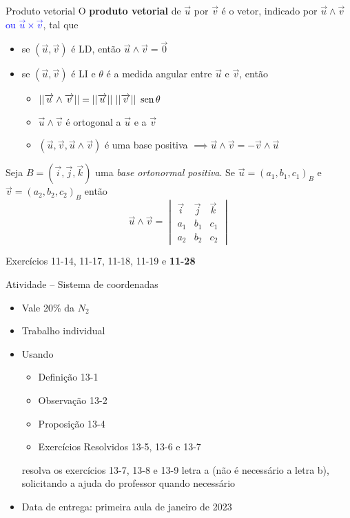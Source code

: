 \begin{frame}{Produto vetorial}
    O \textbf{produto vetorial} de \(\vec{u}\) por \(\vec{v}\) é o vetor, indicado por
    \(\vec{u}\wedge\vec{v}\) \textcolor{blue}{ou \(\vec{u}\times\vec{v}\)}, tal que
    \begin{itemize}
        \item se \((\vec{u},\vec{v})\) é LD, então \(\vec{u}\wedge\vec{v}=\vec{0}\)
        \item se \((\vec{u},\vec{v})\) é LI e \(\theta\) é a medida angular entre \(\vec{u}\) e \(\vec{v}\),
            então
            \begin{itemize}
                \item \(||\overrightarrow{u}\wedge\overrightarrow{v}||=||\overrightarrow{u}||~||\overrightarrow{v}||~\operatorname{sen}{\theta}\)
                \item \(\vec{u}\wedge\vec{v}\) é ortogonal a \(\vec{u}\) e a \(\vec{v}\)
                \item \((\vec{u},\vec{v}, \vec{u}\wedge\vec{v})\) é uma base positiva 
                    \(\implies \vec{u}\wedge\vec{v}=-\vec{v}\wedge\vec{u}\)
            \end{itemize}
    \end{itemize}

    \vspace{1cm}
    \pause
    Seja \(B=(\vec{i},\vec{j},\vec{k})\) uma \textit{base ortonormal positiva}. Se \(\vec{u}=(a_1,b_1,c_1)_B\) e
    \(\vec{v}=(a_2,b_2,c_2)_B\) então
    \[
        \vec{u}\wedge\vec{v}=
        \begin{vmatrix}
            \vec{i} & \vec{j} & \vec{k} \\
            a_1 & b_1 & c_1 \\
            a_2 & b_2 & c_2
        \end{vmatrix}
    \]

    Exercícios 11-14, 11-17, 11-18, 11-19 e \textbf{11-28}
\end{frame}

\begin{frame}{Atividade -- Sistema de coordenadas}
    \begin{itemize}
        \item Vale 20\% da \(N_2\)
        \item Trabalho individual
        \item Usando
            \begin{itemize}
                \item Definição 13-1
                \item Observação 13-2
                \item Proposição 13-4
                \item Exercícios Resolvidos 13-5, 13-6 e 13-7
            \end{itemize}
            resolva os exercícios 13-7, 13-8 e 13-9 letra a (não é necessário a letra b), solicitando a ajuda do
            professor quando necessário
        \item Data de entrega: primeira aula de janeiro de 2023
    \end{itemize}
\end{frame}

